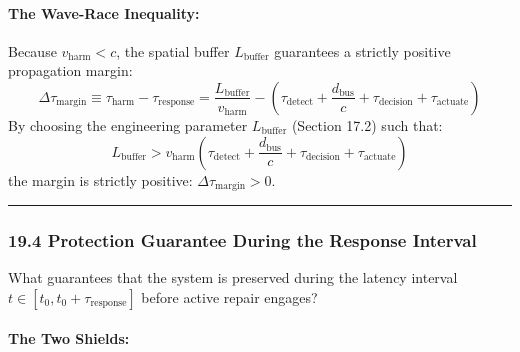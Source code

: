 \documentclass[
]{article}
\begin{document}
\paragraph{The Wave-Race Inequality:}\label{the-wave-race-inequality}

Because \(v_{\mathrm{harm}} < c\), the spatial buffer
\(L_{\mathrm{buffer}}\) guarantees a strictly positive propagation
margin:
\[\Delta \tau_{\mathrm{margin}} \equiv \tau_{\mathrm{harm}} - \tau_{\mathrm{response}} = \frac{L_{\mathrm{buffer}}}{v_{\mathrm{harm}}} - \left(\tau_{\mathrm{detect}} + \frac{d_{\mathrm{bus}}}{c} + \tau_{\mathrm{decision}} + \tau_{\mathrm{actuate}}\right)\]
By choosing the engineering parameter \(L_{\mathrm{buffer}}\) (Section
17.2) such that:
\[L_{\mathrm{buffer}} > v_{\mathrm{harm}} \left(\tau_{\mathrm{detect}} + \frac{d_{\mathrm{bus}}}{c} + \tau_{\mathrm{decision}} + \tau_{\mathrm{actuate}}\right)\]
the margin is strictly positive: \(\Delta \tau_{\mathrm{margin}} > 0\).

\begin{center}\rule{0.5\linewidth}{0.5pt}\end{center}

\subsubsection{19.4 Protection Guarantee During the Response
Interval}\label{protection-guarantee-during-the-response-interval}

What guarantees that the system is preserved during the latency interval
\(t \in [t_0, t_0 + \tau_{\mathrm{response}}]\) before active repair
engages?

\paragraph{The Two Shields:}\label{the-two-shields}
\end{document}

